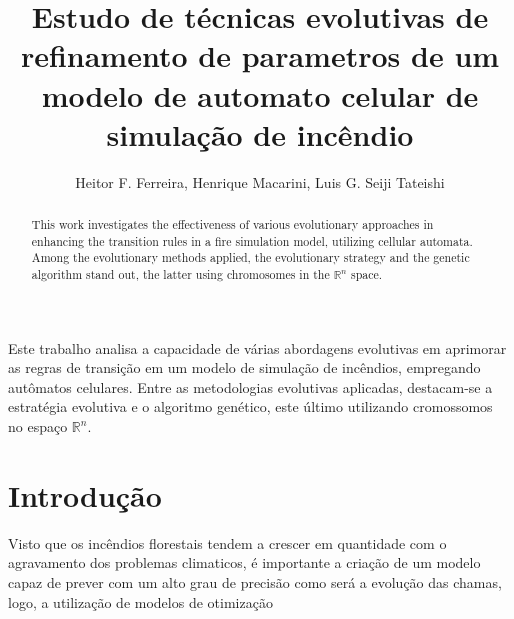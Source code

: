 \documentclass[12pt]{article}
\title{Estudo de técnicas evolutivas de refinamento de parametros de um modelo de automato celular de simulação de incêndio}
\author{Heitor F. Ferreira, Henrique Macarini, Luis G. Seiji Tateishi}
\begin{document}
\maketitle

\begin{abstract}
    This work investigates the effectiveness of various evolutionary approaches in enhancing the transition rules in a fire simulation model, utilizing cellular automata. Among the evolutionary methods applied, the evolutionary strategy and the genetic algorithm stand out, the latter using chromosomes in the \(\mathbb{R}^n\) space.
\end{abstract}

\begin{resumo}
    Este trabalho analisa a capacidade de várias abordagens evolutivas em aprimorar as regras de transição em um modelo de simulação de incêndios, empregando autômatos celulares. Entre as metodologias evolutivas aplicadas, destacam-se a estratégia evolutiva e o algoritmo genético, este último utilizando cromossomos no espaço \(\mathbb{R}^n\).
\end{resumo}


\section{Introdução}
Visto que os incêndios florestais tendem a crescer em quantidade com o agravamento dos problemas climaticos, é importante a criação de um modelo capaz de prever com um alto grau de precisão como será a evolução das chamas, logo, a utilização de modelos de otimização
\end{document}
